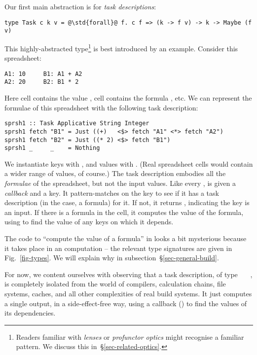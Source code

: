 Our first main abstraction is for \emph{task descriptions}:
\begin{verbatim}
type Task c k v = @\std{forall}@ f. c f => (k -> f v) -> k -> Maybe (f v)
\end{verbatim}
This highly-abstracted type\footnote{Readers familiar with \emph{lenses} or
\emph{profunctor optics} might recognise a familiar pattern. We discuss this
in~\S\ref{sec-related-optics}.} is best introduced by an example.
Consider this \Excel spreadsheet:
\vspace{1mm}
\begin{verbatim}
A1: 10     B1: A1 + A2
A2: 20     B2: B1 * 2
\end{verbatim}
\vspace{1mm}
Here cell  contains the value , cell  contains
the formula , etc. We can represent the formulae of this spreadsheet
with the following task description:
\vspace{1mm}
\begin{verbatim}
sprsh1 :: Task Applicative String Integer
sprsh1 fetch "B1" = Just ((+)   <$> fetch "A1" <*> fetch "A2")
sprsh1 fetch "B2" = Just ((* 2) <$> fetch "B1")
sprsh1 _     _    = Nothing
\end{verbatim}
\vspace{1mm}
We instantiate keys  with , and values  with .
(Real spreadsheet cells would contain a wider range of values, of course.)
The task description  embodies all the \emph{formulae} of the spreadsheet,
but not the input values.  Like every ,  is given a
\emph{callback}  and a key. It pattern-matches on the key to see if it
has a task description (in the \Excel case, a formula) for it. If not, it returns
, indicating the key is an input. If there is a formula in the cell,
it computes the value of the formula, using  to find the value of any
keys on which it depends.

The code to ``compute the value of a formula'' in  looks a bit mysterious
because it takes place in an  computation \cite{mcbride2008applicative}
-- the relevant type signatures are given in Fig.~\ref{fig-types}. We will
explain why in subsection~\S\ref{sec-general-build}.

For now, we content ourselves with observing that a task description,
of type ~~~, is completely isolated from the world of
compilers, calculation chains, file systems, caches, and all other
complexities of real build systems.  It just computes a single output, in
a side-effect-free way, using a callback () to find the values
of its dependencies.

